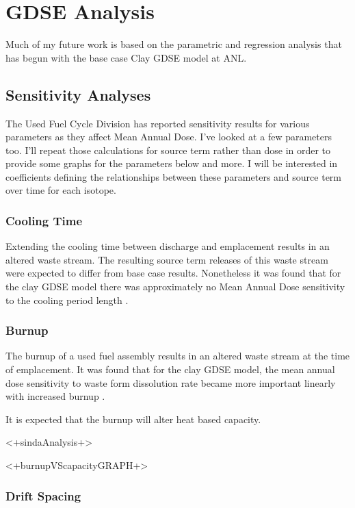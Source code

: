 \section{GDSE Analysis}

Much of my future work is based on the parametric and regression analysis that
has begun with the base case Clay \gls{GDSE} model at \gls{ANL}.

\subsection{Sensitivity Analyses}

The Used Fuel Cycle Division has reported sensitivity results for various 
parameters as they affect Mean Annual Dose. I've looked at a 
few parameters too. I'll repeat those calculations for source term rather than 
dose in order to provide some graphs for the parameters below and more. I will 
be interested in coefficients defining the relationships between these 
parameters and source term over time for each isotope. 

\subsubsection{Cooling Time}

Extending the cooling time between discharge and emplacement results
in an altered waste stream. The resulting source term releases
of this waste stream were expected to differ from base case results. 
Nonetheless it was found that for the clay \gls{GDSE} model there was approximately 
no Mean Annual Dose sensitivity to the cooling period length 
\cite{nutt_generic_2011}.

\subsubsection{Burnup}

The burnup of a used fuel assembly results in an altered waste stream at the 
time of emplacement. It was found that for the clay \gls{GDSE} model, the mean 
annual dose sensitivity to waste form dissolution rate became more important 
linearly with increased burnup \cite{nutt_generic_2011}.

It is expected that the burnup will alter heat based capacity. 

<+sindaAnalysis+>

<+burnupVScapacityGRAPH+>


\subsubsection{Drift Spacing}

